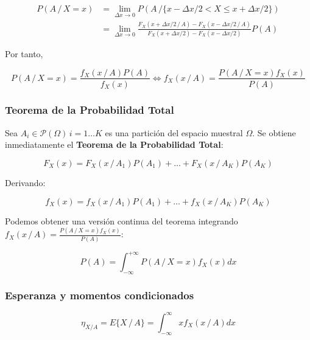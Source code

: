\documentclass[11pt]{article}
\begin{document}
\begin{align*}
P(A \, / \, X=x) & = \lim \limits_{\Delta x \to 0} P(A\, / \{x-\Delta x/2 < X \leq x + \Delta x/2\}) \\
& = \lim \limits_{\Delta x \to 0} \frac{F_X(x +\Delta x/2 \, / \, A)-F_X(x-\Delta x/2 \, / \, A)}{F_X(x+\Delta x/2)-F_X(x-\Delta x/2)}P(A)
\end{align*}

Por tanto,

\[ P(A \, / \, X=x) = \frac{f_X(x \, / \, A)P(A)}{f_X(x)} \iff f_X(x \, / \, A) = \frac{P(A \, / \, X=x)f_X(x)}{P(A)}\]

    \hypertarget{teorema-de-la-probabilidad-total}{%
\subsubsection*{Teorema de la Probabilidad
Total}\label{teorema-de-la-probabilidad-total}}

Sea \(A_i \in \mathscr{P}(\Omega) \, i=1\ldots K\) es una partición del
espacio muestral \(\Omega\). Se obtiene inmediatamente el
\textbf{Teorema de la Probabilidad Total}:

\[F_X(x) = F_X(x \, / \, A_1)P(A_1)+\ldots + F_X(x \, / \, A_K)P(A_K)\]

Derivando:

\[f_X(x) = f_X(x \, / \, A_1)P(A_1)+\ldots + f_X(x \, / \, A_K)P(A_K)\]

Podemos obtener una versión continua del teorema integrando
\(f_X(x \, / \, A) = \frac{P(A \, / \, X=x)f_X(x)}{P(A)}\):

\[P(A) = \int_{-\infty}^{+\infty} P(A \, / \, X=x)f_X(x) dx\]

    \hypertarget{esperanza-y-momentos-condicionados}{%
\subsubsection*{Esperanza y momentos
condicionados}\label{esperanza-y-momentos-condicionados}}

\[\eta_{X/A} = E\{X \, / \, A\}=\int_{-\infty}^{\infty}xf_X(x\, / \, A)dx\]


    
    
    
    
\end{document}
